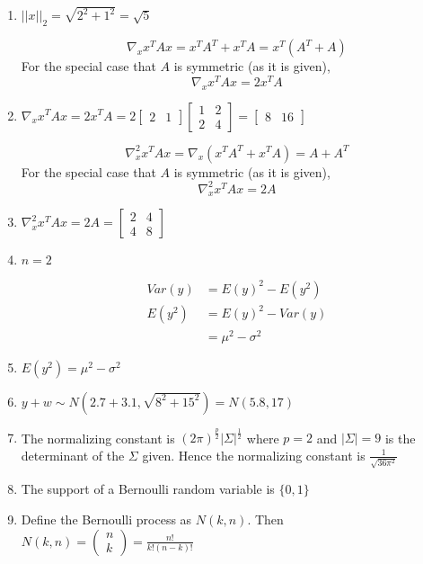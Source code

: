 \documentclass[11pt]{scrartcl}
\begin{document}
\begin{enumerate}
\item $||x||_2 = \sqrt{2^2 + 1^2} = \sqrt{5}$

\[\nabla_x x^T Ax = x^T A^T + x^T A = x^T (A^T + A)\]
For the special case that $A$ is symmetric (as it is given), 
\[\nabla_x x^T Ax = 2x^T A\]
\item $\nabla_x x^T Ax = 2x^T A = 2 \begin{bmatrix} 2 & 1 \end{bmatrix} \begin{bmatrix}1 & 2 \\ 2 & 4\end{bmatrix} = \begin{bmatrix} 8 & 16 \end{bmatrix}$

\[\nabla_x^2 x^T Ax = \nabla_x \left(x^T A^T + x^T A \right) = A + A^T\]
For the special case that $A$ is symmetric (as it is given),
\[\nabla_x^2 x^T Ax = 2A\]
\item $\nabla_x^2 x^T Ax = 2A = \begin{bmatrix}2 & 4 \\ 4 & 8 \end{bmatrix}$

\item $n=2$

\begin{align*}
Var(y) &= E(y)^2 - E(y^2) \\
E(y^2) &= E(y)^2 - Var(y) \\
&= \mu^2 - \sigma^2
\end{align*}
\item $E(y^2) = \mu^2 - \sigma^2$

\item $y + w \sim N(2.7 + 3.1, \sqrt{8^2 + 15^2}) = N(5.8, 17)$

\item The normalizing constant is $(2\pi)^{\frac{p}{2}} |\Sigma|^{\frac{1}{2}}$ where $p=2$ and $|\Sigma| = 9$ is the determinant of the $\Sigma$ given. Hence the normalizing constant is $\frac{1}{\sqrt{36\pi^2}}$

\item The support of a Bernoulli random variable is $\{0,1\}$

\item Define the Bernoulli process as $N(k,n)$. Then $N(k,n) = \begin{pmatrix}n \\ k\end{pmatrix} = \frac{n!}{k!(n-k)!}$


\end{enumerate}
\end{document}
